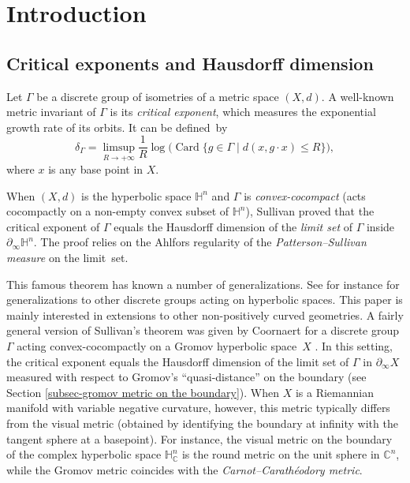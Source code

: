 \documentclass[JEP,XML,SOM,Unicode,NoEqCountersInSection,NoFloatCountersInSection,published]{cedram}
\theoremstyle{definition}
\newcommand{\C}{\mathbb{C}}
\newcommand{\Hyp}{\mathbb{H}}
\DeclareMathOperator{\Card}{Card}
\let\G\Gamma
\begin{document}
\maketitle
\vspace*{-\baselineskip}
\tableofcontents
\mainmatter

\section{Introduction}

\subsection{Critical exponents and Hausdorff dimension}

Let $\G$ be a discrete group of isometries of a metric space $(X,d)$. A well-known metric invariant of $\G$ is its \emph{critical exponent}, which measures the exponential growth rate of its orbits. It can be defined~by
\[\delta_\Gamma = \limsup_{R\to +\infty} \frac{1}{R}\log\bigl(\Card\{g\in \G \mid d(x,g \cdot x) \leq R\}\bigr),\]
where $x$ is any base point in $X$.

When $(X,d)$ is the hyperbolic space $\Hyp^n$ and $\G$ is \emph{convex-cocompact} (\ie acts cocompactly on a non-empty convex subset of $\Hyp^n$), Sullivan \cite{sullivan1979density} proved that the critical exponent of $\G$ equals the Hausdorff dimension of the \emph{limit set} of $\G$ inside $\partial_\infty \Hyp^n$. The proof relies on the Ahlfors regularity of the \emph{Patterson--Sullivan measure} on the limit~set.

This famous theorem has known a number of generalizations. See for instance \cite{DOP,roblin2003ergodicite,Coornaert} for generalizations to other discrete groups acting on hyper\-bolic spaces. This paper is mainly interested in extensions to other non-positively curved geometries. A fairly general version of Sullivan's theorem was given by Coornaert for a discrete group $\G$ acting convex-cocompactly on a Gromov hyperbolic space~$X$ \cite[Cor.\,7.6]{Coornaert}. In this setting, the critical exponent equals the Hausdorff dimension of the limit set of $\G$ in $\partial_\infty X$ measured with respect to Gromov's ``quasi-distance'' on the boundary (see Section \ref{subsec-gromov metric on the boundary}). When $X$ is a Riemannian manifold with variable negative curvature, however, this metric typically differs from the visual metric (obtained by identifying the boundary at infinity with the tangent sphere at a basepoint). For instance, the visual metric on the boundary of the complex hyper\-bolic space $\Hyp^n_\C$ is the round metric on the unit sphere in $\C^n$, while the Gromov metric coincides with the \emph{Carnot--Carathéodory metric}.
\end{document}
